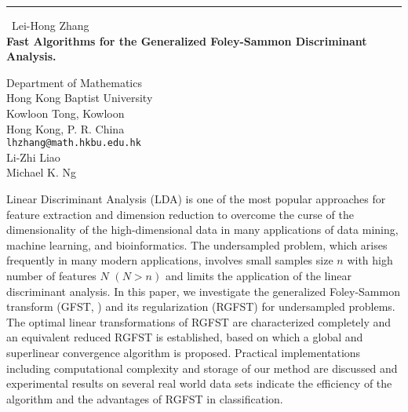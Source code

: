 \documentclass{report}
\begin{document}
\begin{center}
\rule{6in}{1pt} \
{\large Lei-Hong Zhang \\
{\bf Fast Algorithms for the Generalized Foley-Sammon Discriminant Analysis.
}}

Department of Mathematics \\
Hong Kong Baptist University \\
Kowloon Tong, Kowloon \\
Hong Kong, P. R. China \\ 
{\tt lhzhang@math.hkbu.edu.hk}\\
Li-Zhi Liao \\ 
Michael K. Ng
\end{center}


Linear Discriminant Analysis (LDA) is one of the most popular
approaches for feature extraction and dimension reduction to
overcome the curse of the dimensionality of the high-dimensional
data in many applications of data mining, machine learning, and
bioinformatics. The undersampled problem, which arises frequently
in many modern applications, involves small samples size $n$ with
high number of features $N$ $(N> n)$ and limits the application of
the linear discriminant analysis. In this paper, we investigate
the generalized Foley-Sammon transform (GFST,
\cite{Foley&Sammon75,Guo&Li03}) and its regularization (RGFST) for
undersampled problems. The optimal linear transformations of RGFST
are characterized completely and an equivalent reduced RGFST is
established, based on which a global and superlinear convergence
algorithm is proposed. Practical implementations including
computational complexity and storage of our method are discussed
and experimental results on several real world data sets indicate
the efficiency of the algorithm and the advantages of RGFST in
classification.
\end{document}
